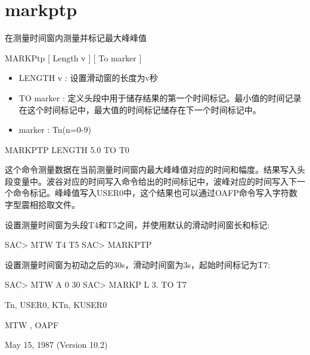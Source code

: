 \section{markptp}
\label{cmd:markptp}

在测量时间窗内测量并标记最大峰峰值

MARKPtp [ Length v ] [ To marker ]

\begin{itemize}
\item LENGTH v : 设置滑动窗的长度为v秒 
\item TO marker : 定义头段中用于储存结果的第一个时间标记。最小值的时间记录在这个时间标记中，最大值的时间标记储存在下一个时间标记中。 
\item marker : Tn(n=0-9)
\end{itemize}

MARKPTP LENGTH 5.0 TO T0

这个命令测量数据在当前测量时间窗内最大峰峰值对应的时间和幅度。结果写入头段变量中。波谷对应的时间写入命令给出的时间标记中，波峰对应的时间写入下一个命令标记。峰峰值写入USER0中，这个结果也可以通过OAFP命令写入字符数字型震相拾取文件。

设置测量时间窗为头段T4和T5之间，并使用默认的滑动时间窗长和标记:
\begin{SACCode}
SAC> MTW T4 T5
SAC> MARKPTP
\end{SACCode}

设置测量时间窗为初动之后的30s，滑动时间窗为3s，起始时间标记为T7:
\begin{SACCode}
SAC> MTW A 0 30
SAC> MARKP L 3. TO T7
\end{SACCode}

Tn, USER0, KTn, KUSER0

MTW , OAPF

May 15, 1987 (Version 10.2)
